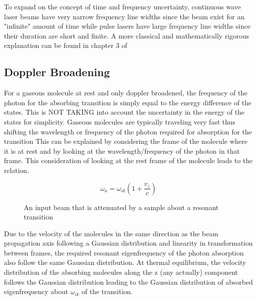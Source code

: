 \documentclass[11pt,a4paper]{book}
\newcommand{\imginput}[1]{} %
\begin{document}
To expand on the concept of time and frequency uncertainty, continuous wave laser beams have very narrow frequency line widths since the beam exist for an "infinite" amount of time while pulse lasers have large frequency line widths since their duration are short and finite. A more classical and mathematically rigorous explanation can be found in chapter 3 of \cite{LaserSpec1}

\subsection{Doppler Broadening}
\label{subsec:Doppler Broadening}
For a gaseous molecule at rest and only doppler broadened, the frequency of the photon for the absorbing transition is simply equal to the energy difference of the states. 
This is NOT TAKING into account the uncertainty in the energy of the states for simplicity.
Gaseous molecules are typically traveling very fast thus shifting the wavelength or frequency of the photon required for absorption for the transition
This can be explained by considering the frame of the molecule where it is at rest and by looking at the wavelength/frequency of the photon in that frame. 
This consideration of looking at the rest frame of the molecule leads to the relation.

\begin{equation}
\label{eq:frequencyInNewRestFrame}
\omega_a =\omega_{ik} \left(1+\dfrac{v_z}{c} \right)
\end{equation}

\begin{figure} [!ht]
	\centering
	\def\svgwidth{\columnwidth}
	\resizebox{150mm}{!}{\imginput{images/dop-broad.pdf_tex}}
	\label{fig:dop-broad}
	\caption{An input beam that is attenuated by a sample about a resonant transition}
\end{figure}	

Due to the velocity of the molecules in the same direction as the beam propagation axis following a Gaussian distribution and linearity in transformation between frames, the required resonant eigenfrequency of the photon absorption also follow the same Gaussian distribution. 
At thermal equilibrium, the velocity distribution of the absorbing molecules along the z (any actually) component follows the Gaussian distribution
leading to the Gaussian distribution of absorbed eigenfrequency about $\omega_{ik}$ of the transition.
\end{document}
